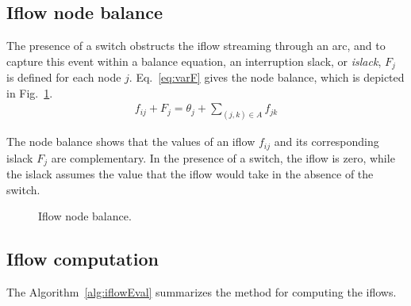 \subsection{Iflow node balance}

The presence of a switch obstructs the iflow streaming through an arc, and to capture this event within a balance equation, an interruption slack, or \textit{islack}, $F_j$ is defined for each node $j$. Eq.~\eqref{eq:varF} gives the node balance, which is depicted in Fig.~\ref{fig:balance}.
\begin{align}  
\displaystyle f_{ij} + F_j = \theta_j + \sum_{(j,k) \in A}{f_{jk}} \label{eq:varF}
\end{align}

The node balance shows that the values of an iflow $f_{ij}$ and its corresponding islack $F_j$ are complementary. In the presence of a switch, the iflow is zero, while the islack assumes the value that the iflow would take in the absence of the switch.

\begin{figure}[hbtp]
	\begin{center}
	\end{center}
\caption{Iflow node balance.}
\label{fig:balance}
\end{figure}

\subsection{Iflow computation}


The Algorithm~\ref{alg:iflowEval} summarizes the method for computing the iflows. 

